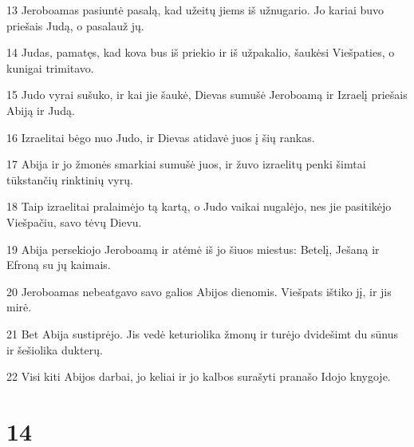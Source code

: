 \par 13 Jeroboamas pasiuntė pasalą, kad užeitų jiems iš užnugario. Jo kariai buvo priešais Judą, o pasala­už jų. 
\par 14 Judas, pamatęs, kad kova bus iš priekio ir iš užpakalio, šaukėsi Viešpaties, o kunigai trimitavo. 
\par 15 Judo vyrai sušuko, ir kai jie šaukė, Dievas sumušė Jeroboamą ir Izraelį priešais Abiją ir Judą. 
\par 16 Izraelitai bėgo nuo Judo, ir Dievas atidavė juos į šių rankas. 
\par 17 Abija ir jo žmonės smarkiai sumušė juos, ir žuvo izraelitų penki šimtai tūkstančių rinktinių vyrų. 
\par 18 Taip izraelitai pralaimėjo tą kartą, o Judo vaikai nugalėjo, nes jie pasitikėjo Viešpačiu, savo tėvų Dievu. 
\par 19 Abija persekiojo Jeroboamą ir atėmė iš jo šiuos miestus: Betelį, Ješaną ir Efroną su jų kaimais. 
\par 20 Jeroboamas nebeatgavo savo galios Abijos dienomis. Viešpats ištiko jį, ir jis mirė. 
\par 21 Bet Abija sustiprėjo. Jis vedė keturiolika žmonų ir turėjo dvidešimt du sūnus ir šešiolika dukterų. 
\par 22 Visi kiti Abijos darbai, jo keliai ir jo kalbos surašyti pranašo Idojo knygoje.



\chapter{14}


